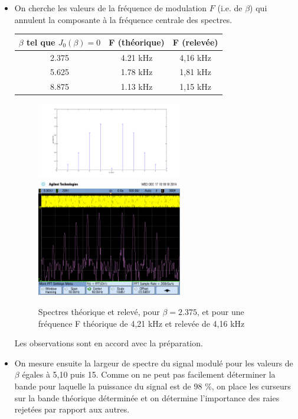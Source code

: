 \documentclass[../../Cours_M1.tex]{subfiles}
\begin{document}
\begin{itemize}\setlength{\itemsep}{10mm}
\item  On cherche les valeurs de la fréquence de modulation $F$ (i.e. de $\beta$) qui annulent la composante à la fréquence centrale des spectres.\\

\begin{center}
\begin{tabular}{|c|c|c|}
\hline 
$\beta$ tel que $J_0(\beta)=0$ & F (théorique) & F (relevée)  \\ 
\hline 
2.375 & 4.21 kHz & 4,16 kHz \\ 
\hline 
5.625 & 1.78 kHz & 1,81 kHz \\ 
\hline 
8.875 & 1.13 kHz & 1,15 kHz \\ 
\hline 
\end{tabular} 
\end{center}

\begin{figure}[h!]
\centering
\includegraphics[width=0.6\textwidth]{beta2375.png}
\includegraphics[width=0.6\textwidth]{bessel03.png}
\caption{Spectres théorique et relevé, pour $\beta=2.375$, et pour une fréquence F théorique de 4,21 kHz et relevée de 4,16 kHz}
\end{figure}

Les observations sont en accord avec la préparation.

\item On mesure ensuite la largeur de spectre du signal modulé pour les valeurs de $\beta$ égales à 5,10 puis 15. Comme on ne peut pas facilement déterminer la bande pour laquelle la puissance du signal est de 98 \%, on place les curseurs sur la bande théorique déterminée et on détermine l'importance des raies rejetées par rapport aux autres.\\


\end{itemize}
\end{document}
